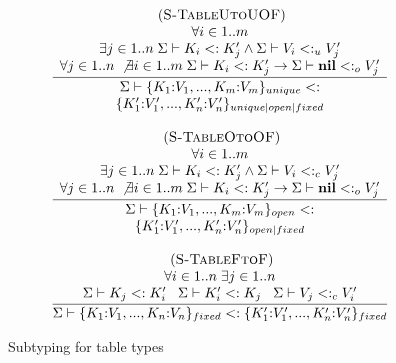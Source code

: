 \documentclass[preprint]{sigplanconf}
\newcommand{\Nil}{\mathbf{nil}}
\newcommand{\mylabel}[1]{\; (\textsc{#1})}
\newcommand{\senv}{\Sigma}
\newcommand{\subtype}{<:}
\begin{document}
\begin{figure}[t]
\[\begin{array}{c}
\begin{array}{c}
\mylabel{S-TableUtoUOF}\\
\dfrac{\begin{array}{c}
	\forall i \in 1..m \\
	\exists j \in 1..n \;
	\senv \vdash K_{i} \subtype K_{j}' \land \senv \vdash V_{i} \subtype_{u} V_{j}' \\
	\forall j \in 1..n \; \not\exists i \in 1..m \;
	\senv \vdash K_{i} \subtype K_{j}' \to \senv \vdash \Nil \subtype_{o} V_{j}'
	\end{array}}
{\begin{array}{c}
	\senv \vdash \{K_{1}{:}V_{1}, ..., K_{m}{:}V_{m}\}_{unique} \subtype\\
	\{K_{1}'{:}V_{1}', ..., K_{n}'{:}V_{n}'\}_{unique|open|fixed}
	\end{array}}
\end{array}\\\\
\begin{array}{c}
\mylabel{S-TableOtoOF}\\
\dfrac{\begin{array}{c}
	\forall i \in 1..m \\
	\exists j \in 1..n \;
	\senv \vdash K_{i} \subtype K_{j}' \land \senv \vdash V_{i} \subtype_{c} V_{j}' \\
	\forall j \in 1..n \; \not\exists i \in 1..m \;
	\senv \vdash K_{i} \subtype K_{j}' \to \senv \vdash \Nil \subtype_{o} V_{j}'
	\end{array}}
{\begin{array}{c}
	\senv \vdash \{K_{1}{:}V_{1}, ..., K_{m}{:}V_{m}\}_{open} \subtype\\
	\{K_{1}'{:}V_{1}', ..., K_{n}'{:}V_{n}'\}_{open|fixed}
	\end{array}}
\end{array}\\\\
\begin{array}{c}
\mylabel{S-TableFtoF}\\
\dfrac{\begin{array}{c}
	\forall i \in 1..n \; \exists j \in 1..n \\
	\senv \vdash K_{j} \subtype K_{i}' \;\;\;
	\senv \vdash K_{i}' \subtype K_{j} \;\;\;
	\senv \vdash V_{j} \subtype_{c} V_{i}'
	\end{array}}
{\senv \vdash \{K_{1}{:}V_{1}, ..., K_{n}{:}V_{n}\}_{fixed} \subtype
	\{K_{1}'{:}V_{1}', ..., K_{n}'{:}V_{n}'\}_{fixed}}
\end{array}
\end{array}
\]
\caption{Subtyping for table types}
\end{figure}
\end{document}
